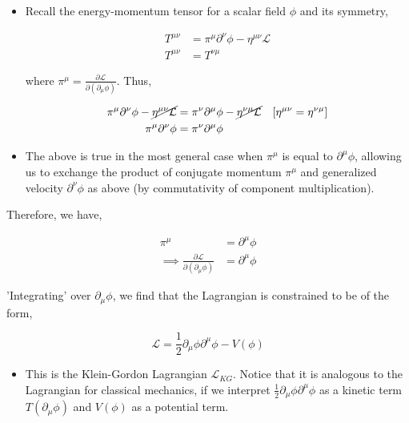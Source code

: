 \documentclass{beamer}
\begin{document}
\begin{frame}
\begin{itemize}
\item Recall the energy-momentum tensor for a scalar field $\phi$ and its symmetry,

\begin{align*}
T^{\mu \nu} & = \pi^\mu \partial^\nu \phi - \eta^{\mu \nu} \mathcal{L} \\
T^{\mu \nu} & = T^{\nu \mu}
\end{align*}

where $\displaystyle{\pi^\mu = \frac{\partial \mathcal{L}}{\partial \left( \partial_\mu \phi \right)}}$. Thus,

\begin{align*}
\pi^\mu \partial^\nu \phi - \cancel{\eta^{\mu \nu} \mathcal{L}} & = \pi^\nu \partial^\mu \phi - \cancel{\eta^{\nu \mu} \mathcal{L}} & \left[ \eta^{\mu \nu} = \eta^{\nu \mu} \right] \\
\pi^\mu \partial^\nu \phi & = \pi^\nu \partial^\mu \phi
\end{align*}

\item The above is true in the most general case when $\pi^\mu$ is equal to $\partial^\mu \phi$, allowing us to exchange the product of conjugate momentum $\pi^\mu$ and generalized velocity $\partial^\nu \phi$ as above (by commutativity of component multiplication). 
\end{itemize}
\end{frame}

\begin{frame}
Therefore, we have,

\begin{align*}
\pi^\mu & = \partial^\mu \phi \\
\implies \frac{\partial \mathcal{L}}{\partial \left( \partial_\mu \phi \right)} & = \partial^\mu \phi
\end{align*}

'Integrating' over $\partial_\mu \phi$, we find that the Lagrangian is constrained to be of the form,

$$\boxed{\mathcal{L} = \frac{1}{2} \partial_\mu \phi \partial^\mu \phi - V \left( \phi \right)}$$

\begin{itemize}
\item This is the Klein-Gordon Lagrangian $\mathcal{L}_{KG}$. Notice that it is analogous to the Lagrangian for classical mechanics, if we interpret $\frac{1}{2} \partial_\mu \phi \partial^\mu \phi$ as a kinetic term $T \left( \partial_\mu \phi \right)$ and $V \left( \phi \right)$ as a potential term.
\end{itemize}
\end{frame}
\end{document}

